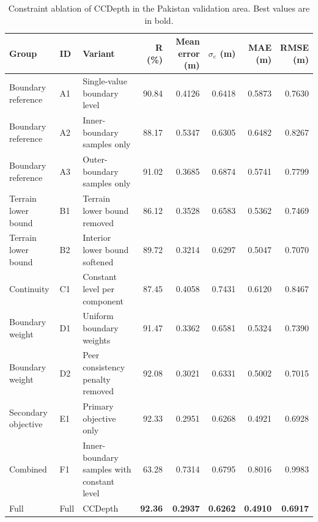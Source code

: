 \documentclass[authoryear,preprint,12pt]{elsarticle}
\begin{document}
\begin{table}[!htbp]
\centering
\comparisonfont
\captionsetup{name=Table,font=comparisoncaption,labelfont=bf,labelsep=newline,justification=raggedright,singlelinecheck=false}
\caption{Constraint ablation of CCDepth in the Pakistan validation area. Best values are in bold.}
\label{tab:ccdepth_ablation}
\fontsize{8}{10}\selectfont
\setlength{\tabcolsep}{3pt}
\renewcommand{\arraystretch}{1.2}
\begin{tabular}{@{}>{\raggedright\arraybackslash}p{2.25cm}llrrrrr@{}}
\toprule
Group & ID & Variant & R (\%) & \makecell{Mean error\\(m)} & \makecell{$\sigma_e$\\(m)} & \makecell{MAE\\(m)} & \makecell{RMSE\\(m)} \\
\midrule
Boundary reference & A1 & Single-value boundary level & 90.84 & 0.4126 & 0.6418 & 0.5873 & 0.7630 \\
Boundary reference & A2 & Inner-boundary samples only & 88.17 & 0.5347 & 0.6305 & 0.6482 & 0.8267 \\
Boundary reference & A3 & Outer-boundary samples only & 91.02 & 0.3685 & 0.6874 & 0.5741 & 0.7799 \\
\midrule
Terrain lower bound & B1 & Terrain lower bound removed & 86.12 & 0.3528 & 0.6583 & 0.5362 & 0.7469 \\
Terrain lower bound & B2 & Interior lower bound softened & 89.72 & 0.3214 & 0.6297 & 0.5047 & 0.7070 \\
\midrule
Continuity & C1 & Constant level per component & 87.45 & 0.4058 & 0.7431 & 0.6120 & 0.8467 \\
\midrule
Boundary weight & D1 & Uniform boundary weights & 91.47 & 0.3362 & 0.6581 & 0.5324 & 0.7390 \\
Boundary weight & D2 & Peer consistency penalty removed & 92.08 & 0.3021 & 0.6331 & 0.5002 & 0.7015 \\
\midrule
Secondary objective & E1 & Primary objective only & 92.33 & 0.2951 & 0.6268 & 0.4921 & 0.6928 \\
\midrule
Combined & F1 & Inner-boundary samples with constant level & 63.28 & 0.7314 & 0.6795 & 0.8016 & 0.9983 \\
\midrule
Full & Full & CCDepth & \textbf{92.36} & \textbf{0.2937} & \textbf{0.6262} & \textbf{0.4910} & \textbf{0.6917} \\
\bottomrule
\end{tabular}
\end{table}
\end{document}
